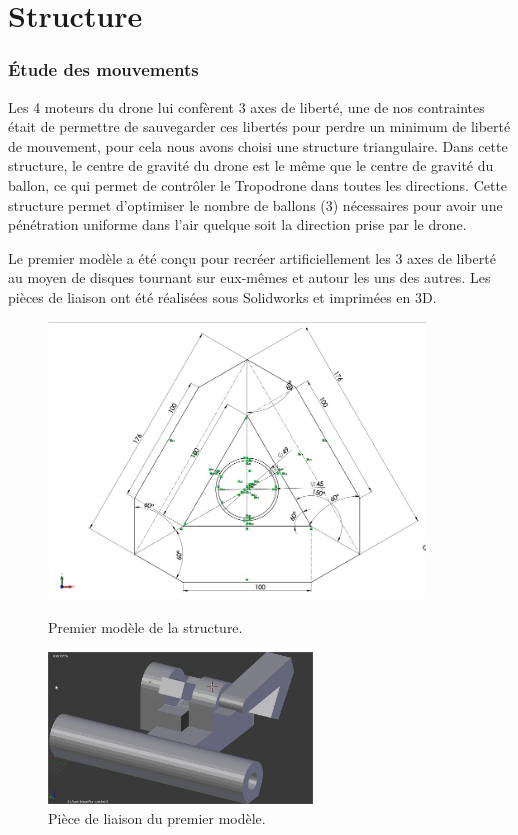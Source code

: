 \documentclass[a4paper,11pt]{article}
\begin{document}
\section{Structure}

\subsubsection{Étude des mouvements}

Les 4 moteurs du drone lui confèrent 3 axes de liberté, une de nos contraintes était de permettre de sauvegarder ces libertés pour perdre un minimum de liberté de mouvement, pour cela nous avons choisi une structure triangulaire. Dans cette structure, le centre de gravité du drone est le même que le centre de gravité du ballon, ce qui permet de contrôler le Tropodrone dans toutes les directions. Cette structure permet d'optimiser le nombre de ballons (3) nécessaires pour avoir une pénétration uniforme dans l'air quelque soit la direction prise par le drone.

Le premier modèle a été conçu pour recréer artificiellement les 3 axes de liberté au moyen de disques tournant sur eux-mêmes et autour les uns des autres. Les pièces de liaison ont été réalisées sous Solidworks et imprimées en 3D.

\begin{figure}[H]
 \centering
 \includegraphics[width=10cm]{../Images/structure0_0.jpg}
 \caption{Premier modèle de la structure.}
 \includegraphics[width=7cm]{../Images/fixation.jpg}
 \caption{Pièce de liaison du premier modèle.}
\end{figure}
\end{document}
